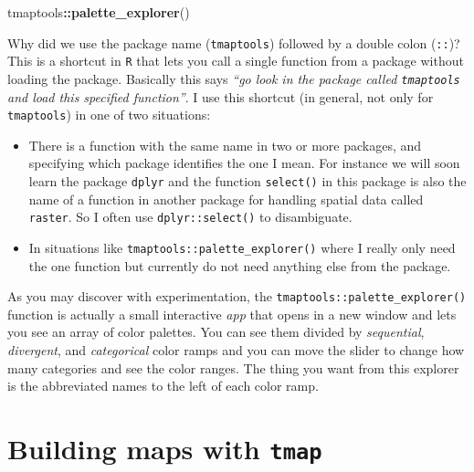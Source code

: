 \documentclass[
]{book}
\newenvironment{Shaded}{\begin{snugshade}}{\end{snugshade}}
\newcommand{\FunctionTok}[1]{\textcolor[rgb]{0.13,0.29,0.53}{\textbf{#1}}}
\newcommand{\NormalTok}[1]{#1}
\newcommand{\SpecialCharTok}[1]{\textcolor[rgb]{0.81,0.36,0.00}{\textbf{#1}}}
\providecommand{\tightlist}{%
  \setlength{\itemsep}{0pt}\setlength{\parskip}{0pt}}
\newenvironment{rmdnote}[1]
  {
  \begin{itemize}
  \renewcommand{\labelitemi}{
    \raisebox{-.7\height}[0pt][0pt]{
      {\setkeys{Gin}{width=3em,keepaspectratio}\texttt{[image: images/\#1]}}
    }
  }
  \setlength{\fboxsep}{1em}
  \begin{note}
  \item
  }
  {
  \end{note}
  \end{itemize}
  }
\begin{document}
\begin{Shaded}
\begin{Highlighting}[]
\NormalTok{tmaptools}\SpecialCharTok{::}\FunctionTok{palette\_explorer}\NormalTok{()}
\end{Highlighting}
\end{Shaded}

\begin{rmdnote}{note}

Why did we use the package name (\texttt{tmaptools}) followed by a double colon (\texttt{::})? This is a shortcut in \texttt{R} that lets you call a single function from a package without loading the package. Basically this says \emph{``go look in the package called \texttt{tmaptools} and load this specified function''}. I use this shortcut (in general, not only for \texttt{tmaptools}) in one of two situations:

\begin{itemize}
\tightlist
\item
  There is a function with the same name in two or more packages, and specifying which package identifies the one I mean. For instance we will soon learn the package \texttt{dplyr} and the function \texttt{select()} in this package is also the name of a function in another package for handling spatial data called \texttt{raster}. So I often use \texttt{dplyr::select()} to disambiguate.
\item
  In situations like \texttt{tmaptools::palette\_explorer()} where I really only need the one function but currently do not need anything else from the package.
\end{itemize}

\end{rmdnote}

As you may discover with experimentation, the \texttt{tmaptools::palette\_explorer()} function is actually a small interactive \emph{app} that opens in a new window and lets you see an array of color palettes. You can see them divided by \emph{sequential}, \emph{divergent}, and \emph{categorical} color ramps and you can move the slider to change how many categories and see the color ranges. The thing you want from this explorer is the abbreviated names to the left of each color ramp.

\hypertarget{building-maps-with-tmap}{%
\section{\texorpdfstring{Building maps with \texttt{tmap}}{Building maps with tmap}}\label{building-maps-with-tmap}}
\end{document}
